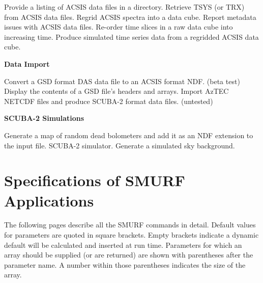 \documentclass[oneside,11pt]{starlink}
\begin{document}
\begin{description}[itemsep=0.pt]
  Provide a listing of ACSIS data files in a directory.
Retrieve TSYS (or TRX) from ACSIS data files.
 Regrid ACSIS spectra into a data cube.
 Report metadata issues with ACSIS data files.
 Re-order time slices in a raw data cube into increasing time.
 Produce simulated time series data from a regridded ACSIS data cube.
\end{description}

{\large
\begin{center}
\textbf{Data Import}
\end{center}
}

\begin{description}[itemsep=0.pt]
 Convert a GSD format DAS data file to an ACSIS format NDF. (beta test)
 Display the contents of a GSD file's headers and arrays.
 Import AzTEC NETCDF files and produce SCUBA-2 format data files. (untested)
\end{description}

{\large
\begin{center}
\textbf{SCUBA-2 Simulations}
\end{center}
}

\begin{description}[itemsep=0.pt]
 Generate a map of random dead bolometers and add it as an NDF extension to the input file.
SCUBA-2 simulator.
 Generate a simulated sky background.
\end{description}



\section{Specifications of SMURF Applications\label{ap:full}}

The following pages describe all the SMURF commands in detail. Default
values for parameters are quoted in square brackets. Empty brackets
indicate a dynamic default will be calculated and inserted at run
time. Parameters for which an array should be supplied (or are
returned) are shown with parentheses after the parameter name. A
number within those parentheses indicates the size of the array.
\end{document}
